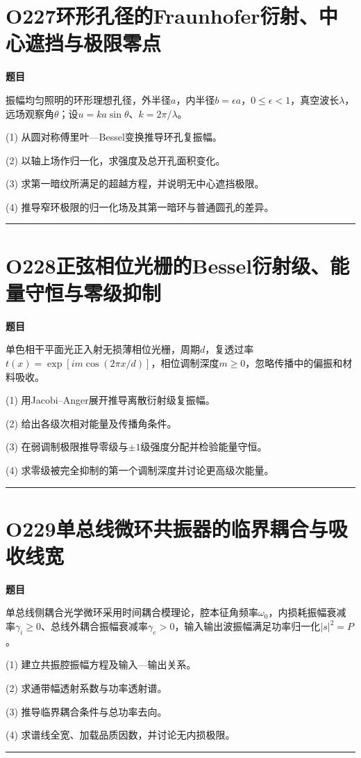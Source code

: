 \documentclass[UTF8,a4paper,11pt,oneside,openany]{ctexbook}
\begin{document}
\section*{O227\quad 环形孔径的Fraunhofer衍射、中心遮挡与极限零点}
\textbf{题目}\par
振幅均匀照明的环形理想孔径，外半径$a$，内半径$b=\epsilon a$，$0\le\epsilon<1$，真空波长$\lambda$，远场观察角$\theta$；设$u=ka\sin\theta$、$k=2\pi/\lambda$。
\par\smallskip\noindent (1) 从圆对称傅里叶—Bessel变换推导环孔复振幅。
\par\smallskip\noindent (2) 以轴上场作归一化，求强度及总开孔面积变化。
\par\smallskip\noindent (3) 求第一暗纹所满足的超越方程，并说明无中心遮挡极限。
\par\smallskip\noindent (4) 推导窄环极限的归一化场及其第一暗环与普通圆孔的差异。
\par\medskip\hrule\medskip
\section*{O228\quad 正弦相位光栅的Bessel衍射级、能量守恒与零级抑制}
\textbf{题目}\par
单色相干平面光正入射无损薄相位光栅，周期$d$，复透过率$t(x)=\exp[i m\cos(2\pi x/d)]$，相位调制深度$m\ge0$，忽略传播中的偏振和材料吸收。
\par\smallskip\noindent (1) 用Jacobi–Anger展开推导离散衍射级复振幅。
\par\smallskip\noindent (2) 给出各级次相对能量及传播角条件。
\par\smallskip\noindent (3) 在弱调制极限推导零级与$\pm1$级强度分配并检验能量守恒。
\par\smallskip\noindent (4) 求零级被完全抑制的第一个调制深度并讨论更高级次能量。
\par\medskip\hrule\medskip
\section*{O229\quad 单总线微环共振器的临界耦合与吸收线宽}
\textbf{题目}\par
单总线侧耦合光学微环采用时间耦合模理论，腔本征角频率$\omega_0$，内损耗振幅衰减率$\gamma_i\ge0$、总线外耦合振幅衰减率$\gamma_e>0$，输入输出波振幅满足功率归一化$|s|^2=P$。
\par\smallskip\noindent (1) 建立共振腔振幅方程及输入—输出关系。
\par\smallskip\noindent (2) 求通带幅透射系数与功率透射谱。
\par\smallskip\noindent (3) 推导临界耦合条件与总功率去向。
\par\smallskip\noindent (4) 求谱线全宽、加载品质因数，并讨论无内损极限。
\par\medskip\hrule\medskip
\end{document}
